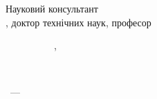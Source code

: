 \vspace{3ex}

\noindent
Науковий консультант \\
\superUa, доктор технічних наук, професор

\vspace{1ex}

\noindent
{\scriptsize
  \parbox[t]{0.47\textwidth}{%
    \CYRC\cyre\cyrishrt\ \cyrp\cyrr\cyri\cyrm\cyrii\cyrr\cyrn\cyri\cyrk\ %
      \cyrd\cyri\cyrs\cyre\cyrr\cyrt\cyra\cyrc\cyrii\cyrishrt\cyrn\cyro\cyryi\ \cyrr\cyro\cyrb\cyro\cyrt\cyri\ %
      \cyrii\cyrd\cyre\cyrn\cyrt\cyri\cyrch\cyrn\cyri\cyrishrt\ \cyrz\cyra\ \cyrz\cyrm\cyrii\cyrs\cyrt\cyro\cyrm\ %
      \cyrz\ \cyrii\cyrn\cyrsh\cyri\cyrm\cyri,\ \cyrp\cyro\cyrd\cyra\cyrn\cyri\cyrm\cyri\ %
      \cyrd\cyro\ \cyrs\cyrp\cyre\cyrc\cyrii\cyra\cyrl\cyrii\cyrz\cyro\cyrv\cyra\cyrn\cyro\cyryi\ %
      \cyrv\cyrch\cyre\cyrn\cyro\cyryi\ \cyrr\cyra\cyrd\cyri\ \Rada%
  }%
}%

\vspace{1ex}%
\noindent
{\scriptsize
  \CYRV\cyrch\cyre\cyrn\cyri\cyrishrt\ \cyrs\cyre\cyrk\cyrr\cyre\cyrt\cyra\cyrr\ %
    \cyrs\cyrp\cyre\cyrc\cyrr\cyra\cyrd\cyri\ \Rada%
    \hfill%
    \SekrRadi%
}

\vspace{2ex}%

\begin{center}
\cityMain\ --- \bookyear
\end{center}



